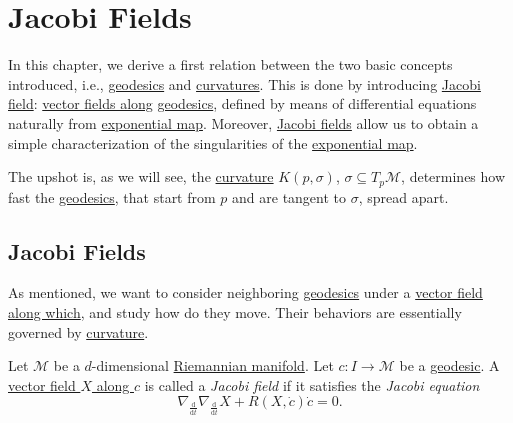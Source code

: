\chapter{Jacobi Fields}

In this chapter, we derive a first relation between the two basic concepts introduced, i.e., \hyperref[def:geodesic]{geodesics} and \hyperref[def:Riemannian-curvature]{curvatures}. This is done by introducing \hyperref[def:Jacobi-field]{Jacobi field}: \hyperref[def:vector-field-along-curve]{vector fields along} \hyperref[def:geodesic]{geodesics}, defined by means of differential equations naturally from \hyperref[def:exponential-map]{exponential map}. Moreover, \hyperref[def:Jacobi-field]{Jacobi fields} allow us to obtain a simple characterization of the singularities of the \hyperref[def:exponential-map]{exponential map}.

\begin{intuition}
	The upshot is, as we will see, the \hyperref[def:sectional-curvature]{curvature} \(K(p, \sigma )\), \(\sigma \subseteq T_p \mathcal{M} \), determines how fast the \hyperref[def:geodesic]{geodesics}, that start from \(p\) and are tangent to \(\sigma \), spread apart.
\end{intuition}

\section{Jacobi Fields}
As mentioned, we want to consider neighboring \hyperref[def:geodesic]{geodesics} under a \hyperref[def:vector-field-along-curve]{vector field along which}, and study how do they move. Their behaviors are essentially governed by \hyperref[def:Riemannian-curvature]{curvature}.

\begin{definition}\label{def:Jacobi-field}
	Let \(\mathcal{M} \) be a \(d\)-dimensional \hyperref[def:Riemannian-manifold]{Riemannian manifold}. Let \(c\colon I \to \mathcal{M} \) be a \hyperref[def:geodesic]{geodesic}. A \hyperref[def:vector-field-along-curve]{vector field \(X\) along \(c\)} is called a \emph{Jacobi field} if it satisfies the \emph{Jacobi equation}
	\begin{equation}\label{eq:Jacobi}
		\nabla _{\frac{\mathrm{d}}{\mathrm{d}t} }\nabla _{\frac{\mathrm{d}}{\mathrm{d}t} }X + R(X, \dot{c} )\dot{c} = 0.
	\end{equation}
\end{definition}

